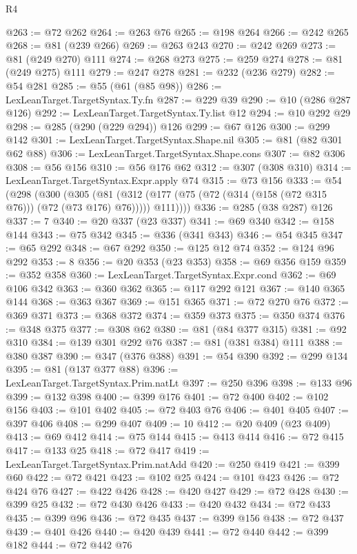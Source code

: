 \begin{lexlean}{R4}
\begin{coremodule}
{{{{{{{{{{{{{{{{{{{{{{{{{{{{{@263 := @72 @262
@264 := @263 @76
@265 := @198 @264
@266 := @242 @265
@268 := @81 (@239 @266)
@269 := @263 @243
@270 := @242 @269
@273 := @81 (@249 @270) @111
@274 := @268 @273
@275 := @259 @274
@278 := @81 (@249 @275) @111
@279 := @247 @278
@281 := @232 (@236 @279)
@282 := @54 @281
@285 := @55 (@61 (@85 @98))
@286 := LexLeanTarget.TargetSyntax.Ty.fn
@287 := @229 @39
@290 := @10 (@286 @287 @126)
@292 := LexLeanTarget.TargetSyntax.Ty.list @12
@294 := @10 @292 @29
@298 := @285 (@290 (@229 @294)) @126
@299 := @67 @126
@300 := @299 @142
@301 := LexLeanTarget.TargetSyntax.Shape.nil
@305 := @81 (@82 @301 @62 @88)
@306 := LexLeanTarget.TargetSyntax.Shape.cons
@307 := @82 @306
@308 := @56 @156
@310 := @56 @176 @62
@312 := @307 (@308 @310)
@314 := LexLeanTarget.TargetSyntax.Expr.apply @74
@315 := @73 @156
@333 := @54
    (@298
      (@300
        (@305
          (@81 (@312 (@177 (@75 (@72 (@314 (@158 (@72 @315 @76))) (@72 (@73 @176) @76))))) @111))))
@336 := @285 (@38 @287) @126
@337 := 7
@340 := @20 @337 (@23 @337)
@341 := @69 @340
@342 := @158 @144
@343 := @75 @342
@345 := @336 (@341 @343)
@346 := @54 @345
@347 := @65 @292
@348 := @67 @292
@350 := @125 @12 @74
@352 := @124 @96 @292
@353 := 8
@356 := @20 @353 (@23 @353)
@358 := @69 @356 @159
@359 := @352 @358
@360 := LexLeanTarget.TargetSyntax.Expr.cond
@362 := @69 @106 @342
@363 := @360 @362
@365 := @117 @292 @121
@367 := @140 @365 @144
@368 := @363 @367
@369 := @151 @365
@371 := @72 @270 @76
@372 := @369 @371
@373 := @368 @372
@374 := @359 @373
@375 := @350 @374
@376 := @348 @375
@377 := @308 @62
@380 := @81 (@84 @377 @315)
@381 := @92 @310
@384 := @139 @301 @292 @76
@387 := @81 (@381 @384) @111
@388 := @380 @387
@390 := @347 (@376 @388)
@391 := @54 @390
@392 := @299 @134
@395 := @81 (@137 @377 @88)
@396 := LexLeanTarget.TargetSyntax.Prim.natLt
@397 := @250 @396
@398 := @133 @96
@399 := @132 @398
@400 := @399 @176
@401 := @72 @400
@402 := @102 @156
@403 := @101 @402
@405 := @72 @403 @76
@406 := @401 @405
@407 := @397 @406
@408 := @299 @407
@409 := 10
@412 := @20 @409 (@23 @409)
@413 := @69 @412
@414 := @75 @144
@415 := @413 @414
@416 := @72 @415
@417 := @133 @25
@418 := @72 @417
@419 := LexLeanTarget.TargetSyntax.Prim.natAdd
@420 := @250 @419
@421 := @399 @60
@422 := @72 @421
@423 := @102 @25
@424 := @101 @423
@426 := @72 @424 @76
@427 := @422 @426
@428 := @420 @427
@429 := @72 @428
@430 := @399 @25
@432 := @72 @430 @426
@433 := @420 @432
@434 := @72 @433
@435 := @399 @96
@436 := @72 @435
@437 := @399 @156
@438 := @72 @437
@439 := @401 @426
@440 := @420 @439
@441 := @72 @440
@442 := @399 @182
@444 := @72 @442 @76
}}}}}}}}}}}}}}}}}}}}}}}}}}}}}
\end{coremodule}
\end{lexlean}
